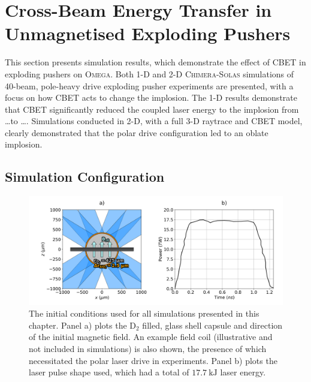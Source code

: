 \section{Cross-Beam Energy Transfer in Unmagnetised Exploding Pushers}%
\label{sec:Res2_CBET_expl}

This section presents simulation results, which demonstrate the effect of \ac{CBET} in exploding pushers on \textsc{Omega}.
Both 1-D and 2-D \textsc{Chimera}-\textsc{Solas} simulations of 40-beam, pole-heavy drive exploding pusher experiments are presented, with a focus on how \ac{CBET} acts to change the implosion.
The 1-D results demonstrate that \ac{CBET} significantly reduced the coupled laser energy to the implosion from \dots to \dots.
Simulations conducted in 2-D, with a full 3-D raytrace and \ac{CBET} model, clearly demonstrated that the polar drive configuration led to an oblate implosion. 

\subsection{Simulation Configuration}%
\label{sec:Res2_simconfig}

\begin{figure}[t!]
    \includegraphics[width=\linewidth]{Results2/Images/magpdd_diagram_pulse.png}
    \centering
    \caption{The initial conditions used for all simulations presented in this chapter.
    Panel a) plots the D${}_{2}$ filled, glass shell capsule and direction of the initial magnetic field.
    An example field coil (illustrative and not included in simulations) is also shown, the presence of which necessitated the polar laser drive in experiments.
    Panel b) plots the laser pulse shape used, which had a total of $17.7\ \text{kJ}$ laser energy.}%
    \label{fig:Res2_simconfig}
\end{figure}


